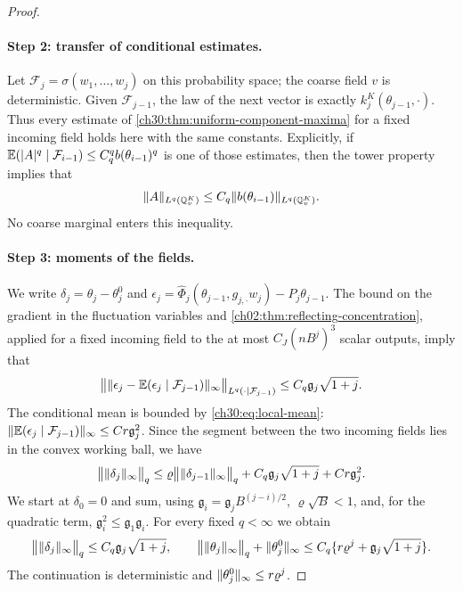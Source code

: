 \begin{proof}
\paragraph{Step 2: transfer of conditional estimates.} Let $\mathcal F_j=\sigma(w_1,\ldots,w_j)$ on this probability space; the coarse field $v$ is deterministic. Given $\mathcal F_{j-1}$, the law of the next vector is exactly $k_j^K(\theta_{j-1},\cdot)$. Thus every estimate of \cref{ch30:thm:uniform-component-maxima} for a fixed incoming field holds here with the same constants. Explicitly, if $\mathbb E(\lvert A\rvert^q\mid\mathcal F_{i-1})\le C_q^qb(\theta_{i-1})^q$ is one of those estimates, then the tower property implies that
\begin{equation}\label{ch30:eq:tower}
 \lVert A\rVert_{L^q(\mathbb Q_v^K)}\le C_q\lVert b(\theta_{i-1})\rVert_{L^q(\mathbb Q_v^K)} .
\end{equation}
No coarse marginal enters this inequality.

\paragraph{Step 3: moments of the fields.} We write $\delta_j=\theta_j-\theta_j^0$ and $\epsilon_j=\widehat\Phi_j(\theta_{j-1},g_{j,\cdot}w_j)-P_j\theta_{j-1}$. The bound on the gradient in the fluctuation variables and \cref{ch02:thm:reflecting-concentration}, applied for a fixed incoming field to the at most $C_J(nB^j)^3$ scalar outputs, imply that
\[
 \bigl\lVert\lVert \epsilon_j-\mathbb E(\epsilon_j\mid\mathcal F_{j-1})\rVert_\infty\bigr\rVert_{L^q(\cdot\mid\mathcal F_{j-1})}\le C_q\mathfrak g_j\sqrt{1+j}.
\]
The conditional mean is bounded by \eqref{ch30:eq:local-mean}: $\lVert \mathbb E(\epsilon_j\mid\mathcal F_{j-1})\rVert_\infty\le Cr\mathfrak g_j^2$. Since the segment between the two incoming fields lies in the convex working ball, we have
\[
 \bigl\lVert\lVert \delta_j\rVert_\infty\bigr\rVert_q\le\varrho\bigl\lVert\lVert \delta_{j-1}\rVert_\infty\bigr\rVert_q+C_q\mathfrak g_j\sqrt{1+j}+Cr\mathfrak g_j^2 .
\]
We start at $\delta_0=0$ and sum, using $\mathfrak g_i=\mathfrak g_jB^{(j-i)/2}$, $\varrho\sqrt B<1$, and, for the quadratic term, $\mathfrak g_i^2\le\mathfrak g_1\mathfrak g_i$. For every fixed $q<\infty$ we obtain
\begin{equation}\label{ch30:eq:terminal-field-moments}
 \bigl\lVert\lVert \delta_j\rVert_\infty\bigr\rVert_q\le C_q\mathfrak g_j\sqrt{1+j},\qquad
 \bigl\lVert\lVert \theta_j\rVert_\infty\bigr\rVert_q+\lVert \theta_j^0\rVert_\infty\le C_q\{r\varrho^j+\mathfrak g_j\sqrt{1+j}\}.
\end{equation}
The continuation is deterministic and $\lVert \theta_j^0\rVert_\infty\le r\varrho^j$.


\end{proof}
